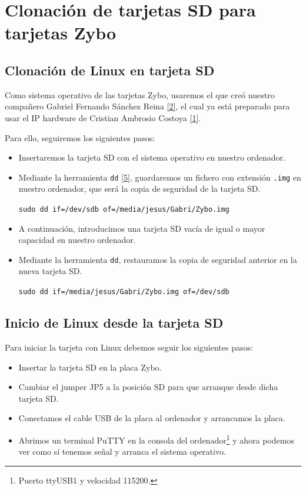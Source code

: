 \section{Clonación de tarjetas SD para tarjetas Zybo}
\hypertarget{InstalacionLinux}{}
\subsection{Clonación de Linux en tarjeta SD}
Como sistema operativo de las tarjetas Zybo, usaremos el que creó nuestro compañero Gabriel Fernando Sánchez Reina \hyperlink{2}{[2]}, el cual ya está preparado para usar el IP hardware de Cristian Ambrosio Costoya \hyperlink{1}{[1]}.

Para ello, seguiremos los siguientes pasos:
\begin{itemize}
	\item Insertaremos la tarjeta SD con el sistema operativo en nuestro ordenador.
	\item Mediante la herramienta \texttt{dd} \hyperlink{5}{[5]}, guardaremos un fichero con extensión \texttt{.img} en nuestro ordenador, que será la copia de seguridad de la tarjeta SD.
	\begin{center}
		\texttt{sudo dd if=/dev/sdb of=/media/jesus/Gabri/Zybo.img}
	\end{center}
	\item A continuación, introducimos una tarjeta SD vacía de igual o mayor capacidad en nuestro ordenador.
	\item Mediante la herramienta \texttt{dd}, restauramos la copia de seguridad anterior en la nueva tarjeta SD.
	\begin{center}
		\texttt{sudo dd if=/media/jesus/Gabri/Zybo.img of=/dev/sdb}
	\end{center}
\end{itemize}

\subsection{Inicio de Linux desde la tarjeta SD}
Para iniciar la tarjeta con Linux debemos seguir los siguientes pasos:
\begin{itemize}
	\item Insertar la tarjeta SD en la placa Zybo.
	\item Cambiar el jumper JP5 a la posición SD para que arranque desde dicha tarjeta SD.
	\item Conectamos el cable USB de la placa al ordenador y arrancamos la placa.
	\item Abrimos un terminal PuTTY en la consola del ordenador\footnote{Puerto ttyUSB1 y velocidad 115200.} y ahora podemos ver como sí tenemos señal y arranca el sistema operativo.
\end{itemize}

